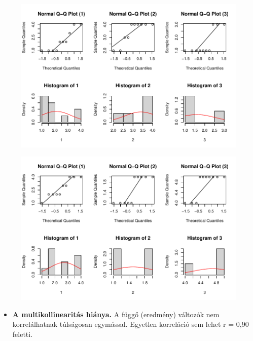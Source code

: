 \documentclass[
  letterpaper,
]{krantz}
\providecommand{\tightlist}{%
  \setlength{\itemsep}{0pt}\setlength{\parskip}{0pt}}\usepackage{longtable,booktabs,array}
\begin{document}
\begin{figure}[H]

{\centering \includegraphics{./sec_tobbvaltozos_variancia_files/figure-pdf/unnamed-chunk-17-2.pdf}

}

\end{figure}

\begin{figure}[H]

{\centering \includegraphics{./sec_tobbvaltozos_variancia_files/figure-pdf/unnamed-chunk-17-3.pdf}

}

\end{figure}

\begin{itemize}
\tightlist
\item
  \textbf{A multikollinearitás hiánya.} A függő (eredmény) változók nem
  korrelálhatnak túlságosan egymással. Egyetlen korreláció sem lehet r =
  0,90 feletti.
\end{itemize}
\end{document}
